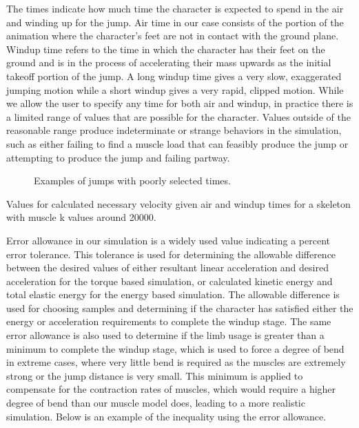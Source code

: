 The times indicate how much time the character is expected to spend in the air and winding up for the jump.  Air time in our case consists of the portion of the animation where the character's feet are not in contact with the ground plane.  Windup time refers to the time in which the character has their feet on the ground and is in the process of accelerating their mass upwards as the initial takeoff portion of the jump.  A long windup time gives a very slow, exaggerated jumping motion while a short windup gives a very rapid, clipped motion.  While we allow the user to specify any time for both air and windup, in practice there is a limited range of values that are possible for the character.  Values outside of the reasonable range produce indeterminate or strange behaviors in the simulation, such as either failing to find a muscle load that can feasibly produce the jump or attempting to produce the jump and failing partway.
\begin{figure}[ht]
	\centering
	\caption{Examples of jumps with poorly selected times.}
	\label{fig:bad_time_jumps}
\end{figure}

\begin{table}[ht]
	\centering
	
	\caption{Values for calculated necessary velocity given air and windup times for a skeleton with muscle k values around 20000.}
\end{table}

Error allowance in our simulation is a widely used value indicating a percent error tolerance.  This tolerance is used for determining the allowable difference between the desired values of either resultant linear acceleration and desired acceleration for the torque based simulation, or calculated kinetic energy and total elastic energy for the energy based simulation.  The allowable difference is used for choosing samples and determining if the character has satisfied either the energy or acceleration requirements to complete the windup stage.  The same error allowance is also used to determine if the limb usage is greater than a minimum to complete the windup stage, which is used to force a degree of bend in extreme cases, where very little bend is required as the muscles are extremely strong or the jump distance is very small.  This minimum is applied to compensate for the contraction rates of muscles, which would require a higher degree of bend than our muscle model does, leading to a more realistic simulation.  Below is an example of the inequality using the error allowance.

